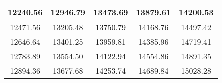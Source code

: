 \begin{large}\begin{tabular}{|c|c|c|c|c|}
\hline
12240.56&12946.79&13473.69&13879.61&14200.53\\\hline
12471.56&13205.48&13750.79&14168.76&14497.42\\\hline
12646.64&13401.25&13959.81&14385.96&14719.41\\\hline
12783.89&13554.50&14122.94&14554.86&14891.35\\\hline
12894.36&13677.68&14253.74&14689.84&15028.28\\\hline
\end{tabular}
\end{large}